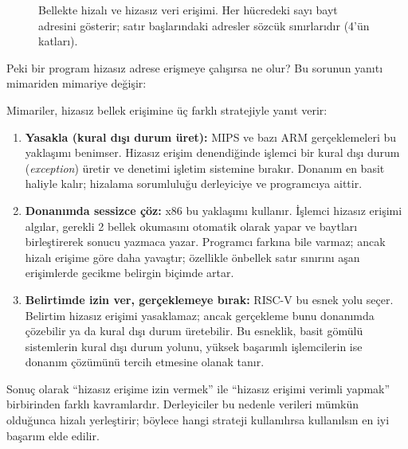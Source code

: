 \begin{figure}[H]
\caption[Bellekte hizalı ve hizasız veri erişimi]{Bellekte hizalı ve hizasız veri erişimi. Her hücredeki sayı bayt adresini gösterir; satır başlarındaki adresler sözcük sınırlarıdır (4'ün katları).}
\label{fig:bellek-hizali}
\end{figure}

Peki bir program hizasız adrese erişmeye çalışırsa ne olur? Bu sorunun yanıtı mimariden mimariye değişir:

\begin{karsilastirma}
Mimariler, hizasız bellek erişimine üç farklı stratejiyle yanıt verir:

\begin{enumerate}[nosep]
\item \textbf{Yasakla (kural dışı durum üret):} MIPS ve bazı ARM gerçeklemeleri bu yaklaşımı benimser. Hizasız erişim denendiğinde işlemci bir kural dışı durum (\emph{exception}) üretir ve denetimi işletim sistemine bırakır. Donanım en basit haliyle kalır; hizalama sorumluluğu derleyiciye ve programcıya aittir.

\item \textbf{Donanımda sessizce çöz:} x86 bu yaklaşımı kullanır. İşlemci hizasız erişimi algılar, gerekli 2 bellek okumasını otomatik olarak yapar ve baytları birleştirerek sonucu yazmaca yazar. Programcı farkına bile varmaz; ancak hizalı erişime göre daha yavaştır; özellikle önbellek satır sınırını aşan erişimlerde gecikme belirgin biçimde artar.

\item \textbf{Belirtimde izin ver, gerçeklemeye bırak:} RISC-V bu esnek yolu seçer. Belirtim hizasız erişimi yasaklamaz; ancak gerçekleme bunu donanımda çözebilir ya da kural dışı durum üretebilir. Bu esneklik, basit gömülü sistemlerin kural dışı durum yolunu, yüksek başarımlı işlemcilerin ise donanım çözümünü tercih etmesine olanak tanır.
\end{enumerate}

Sonuç olarak ``hizasız erişime izin vermek'' ile ``hizasız erişimi verimli yapmak'' birbirinden farklı kavramlardır. Derleyiciler bu nedenle verileri mümkün olduğunca hizalı yerleştirir; böylece hangi strateji kullanılırsa kullanılsın en iyi başarım elde edilir.
\end{karsilastirma}

